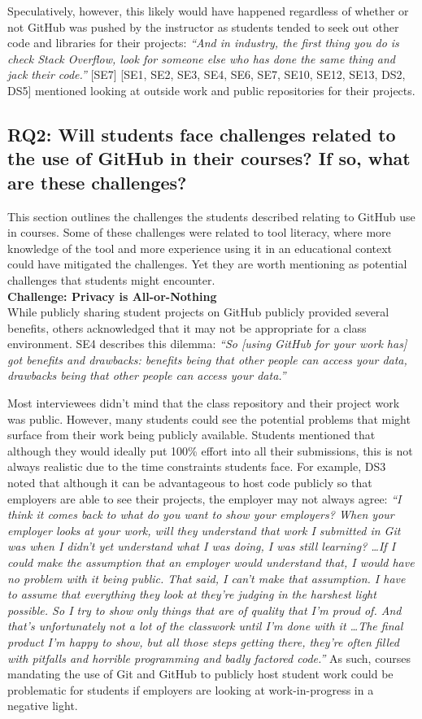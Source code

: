 Speculatively, however, this likely would have happened regardless of whether or not GitHub was pushed by the instructor as students tended to seek out other code and libraries for their projects: \textit{``And in industry, the first thing you do is check Stack Overflow, look for someone else who has done the same thing and jack their code.''} [SE7] [SE1, SE2, SE3, SE4, SE6, SE7, SE10, SE12, SE13, DS2, DS5] mentioned looking at outside work and public repositories for their projects.

\subsection{RQ2: Will students face challenges related to the use of GitHub in their courses? If so, what are these challenges?}
This section outlines the challenges the students described relating to GitHub use in courses. Some of these challenges were related to tool literacy, where more knowledge of the tool and more experience using it in an educational context could have mitigated the challenges. Yet they are worth mentioning as potential challenges that students might encounter. \\

\textbf{Challenge: Privacy is All-or-Nothing} \\
While publicly sharing student projects on GitHub publicly provided several benefits, others acknowledged that it may not be appropriate for a class environment. SE4 describes this dilemma: \textit{``So [using GitHub for your work has] got benefits and drawbacks: benefits being that other people can access your data, drawbacks being that other people can access your data.''}

Most interviewees didn't mind that the class repository and their project work was public. However, many students could see the potential problems that might surface from their work being publicly available. Students mentioned that although they would ideally put 100\% effort into all their submissions, this is not always realistic due to the time constraints students face. For example, DS3 noted that although it can be advantageous to host code publicly so that employers are able to see their projects, the employer may not always agree: \textit{``I think it comes back to what do you want to show your employers? When your employer looks at your work, will they understand that work I submitted in Git was when I didn't yet understand what I was doing, I was still learning? \ldots If I could make the assumption that an employer would understand that, I would have no problem with it being public. That said, I can't make that assumption. I have to assume that everything they look at they're judging in the harshest light possible. So I try to show only things that are of quality that I'm proud of. And that's unfortunately not a lot of the classwork until I'm done with it \ldots The final product I'm happy to show, but all those steps getting there, they're often filled with pitfalls and horrible programming and badly factored code.''} As such, courses mandating the use of Git and GitHub to publicly host student work could be problematic for students if employers are looking at work-in-progress in a negative light.

